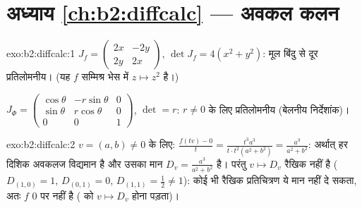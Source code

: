 \section*{अध्याय \ref{ch:b2:diffcalc} --- अवकल कलन}

\begin{solution}{exo:b2:diffcalc:1}
$J_f = \begin{pmatrix} 2x & -2y\\ 2y & 2x\end{pmatrix}$, $\det J_f
= 4(x^2 + y^2)$: मूल बिंदु से दूर प्रतिलोमनीय। (यह $f$ सम्मिश्र भेस में $z
\mapsto z^2$ है।)

$J_\Phi = \begin{pmatrix} \cos\theta & -r\sin\theta & 0\\
\sin\theta & r\cos\theta & 0\\ 0 & 0 & 1\end{pmatrix}$, $\det = r$: $r \neq 0$ के लिए प्रतिलोमनीय (बेलनीय निर्देशांक)।
\end{solution}

\begin{solution}{exo:b2:diffcalc:2}
$v = (a, b) \neq 0$ के लिए: $\frac{f(tv) - 0}{t} = \frac{t^3a^3}{t\cdot
t^2(a^2+b^2)} = \frac{a^3}{a^2 + b^2}$: अर्थात् हर दिशिक अवकलज विद्यमान है और उसका मान $D_v = \frac{a^3}{a^2+b^2}$ है।
परंतु $v
\mapsto D_v$ रैखिक नहीं है ($D_{(1,0)} = 1$, $D_{(0,1)} = 0$, $D_{(1,1)} = \frac12 \neq 1$): कोई भी रैखिक प्रतिचित्रण ये मान
नहीं दे सकता, अतः $f$ $0$ पर  नहीं है ( को $v \mapsto D_v$ होना पड़ता)।
\end{solution}

